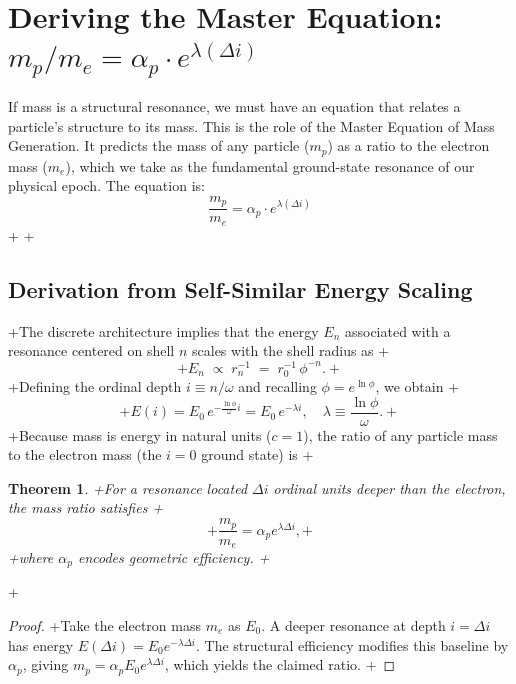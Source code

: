 \documentclass[12pt]{report}
\newtheorem{theorem}{Theorem}[chapter]
\begin{document}
\section{Deriving the Master Equation: \texorpdfstring{$m_p/m_e = \alpha_p \cdot e^{\lambda (\Delta i)}$}{m_p/m_e = α_p * exp(λ * Δi)}}
If mass is a structural resonance, we must have an equation that relates a particle's structure to its mass. This is the role of the Master Equation of Mass Generation. It predicts the mass of any particle ($m_p$) as a ratio to the electron mass ($m_e$), which we take as the fundamental ground-state resonance of our physical epoch. The equation is:
\begin{equation}
\frac{m_p}{m_e} = \alpha_p \cdot e^{\lambda (\Delta i)}
\label{eq:master}
\end{equation}
+
+\subsection{Derivation from Self-Similar Energy Scaling}
+The discrete architecture implies that the energy $E_n$ associated with a resonance centered on shell $n$ scales with the shell radius as
+\begin{equation}
+    E_n \;\propto\; r_n^{-1} \;=\; r_0^{-1}\,\phi^{-n}.
+\end{equation}
+Defining the ordinal depth $i \equiv n/\omega$ and recalling $\phi = e^{\ln\phi}$, we obtain
+\begin{equation}
+    E(i) = E_0\,e^{-\frac{\ln\phi}{\omega} i} = E_0\,e^{-\lambda i}, \quad \lambda \equiv \frac{\ln\phi}{\omega}.
+\end{equation}
+Because mass is energy in natural units ($c=1$), the ratio of any particle mass to the electron mass (the $i=0$ ground state) is
+\begin{theorem}
+For a resonance located $\Delta i$ ordinal units deeper than the electron, the mass ratio satisfies
+\begin{equation}
+    \frac{m_p}{m_e} = \alpha_p e^{\lambda \Delta i},
+\end{equation}
+where $\alpha_p$ encodes geometric efficiency.
+\end{theorem}
+\begin{proof}
+Take the electron mass $m_e$ as $E_0$. A deeper resonance at depth $i=\Delta i$ has energy $E(\Delta i)=E_0 e^{-\lambda \Delta i}$. The structural efficiency modifies this baseline by $\alpha_p$, giving $m_p = \alpha_p E_0 e^{\lambda \Delta i}$, which yields the claimed ratio.
+\end{proof}
\end{document}
